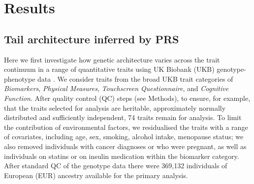 \documentclass[12pt]{zHenriquesLab-StyleBioRxiv}
\begin{document}
% 
% 
% 
% 
% 
% 
% 
% 
% 
% 
% 
% 
% 
%
% 
% 
% 
% 
% 
% 
% 
% 
% 
% 
% 
% 
% 
% 
% 
% 
% 
% 
% 
\section*{Results} \label{sec:results} 
\subsection*{Tail architecture inferred by PRS} 
Here we first investigate how genetic architecture 
varies across the trait continuum in a range of 
quantitative traits using UK Biobank (UKB) 
genotype-phenotype data \cite{Bycroft2018}. We consider traits 
from the broad UKB trait categories of \emph{Biomarkers}, 
\emph{Physical Measures}, \emph{Touchscreen Questionnaire}, and \emph{Cognitive Function}. 
After quality control (QC) steps (see Methods), to ensure, for example, 
that the traits selected for analysis are heritable, approximately normally distributed and 
sufficiently independent, 74 traits remain for analysis. 
To limit the contribution of environmental factors, we 
residualised the traits with a range of covariates, including 
age, sex, smoking, alcohol intake, menopause status; 
we also removed individuals with cancer diagnoses or who 
were pregnant, as well as individuals on statins or on 
insulin medication within the biomarker category. 
After standard QC of the genotype data
there were 369,132 individuals of European (EUR)
ancestry available for the primary analysis.
\end{document}
